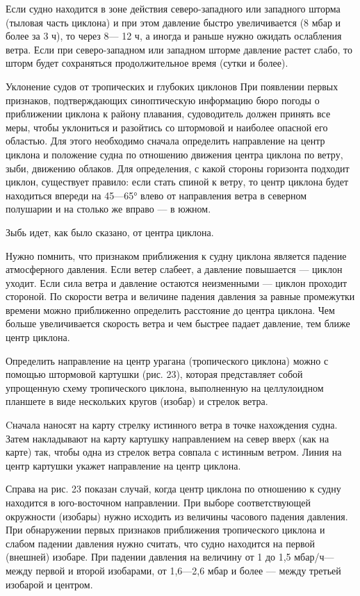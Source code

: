 Если судно находится в зоне действия северо-западного или западного шторма (тыловая часть циклона) и при этом давление быстро увеличивается (8 мбар и более за 3 ч), то через 8— 12 ч, а иногда и раньше нужно ожидать ослабления ветра. Если при северо-западном или западном шторме давление растет слабо, то шторм будет сохраняться продолжительное время (сутки и более).

Уклонение судов от тропических и глубоких циклонов
При появлении первых признаков, подтверждающих синоптическую информацию бюро погоды о приближении циклона к району плавания, судоводитель должен принять все меры, чтобы уклониться и разойтись со штормовой и наиболее опасной его областью. Для этого необходимо сначала определить направление на центр циклона и положение судна по отношению движения центра циклона по ветру, зыби, движению облаков. Для определения, с какой стороны горизонта подходит циклон, существует правило: если стать спиной к ветру, то центр циклона будет находиться впереди на 45—65° влево от направления ветра в северном полушарии и на столько же вправо — в южном.

Зыбь идет, как было сказано, от центра циклона.

Нужно помнить, что признаком приближения к судну циклона является падение атмосферного давления. Если ветер слабеет, а давление повышается — циклон уходит. Если сила ветра и давление остаются неизменными — циклон проходит стороной. По скорости ветра и величине падения давления за равные промежутки времени можно приближенно определить расстояние до центра циклона. Чем больше увеличивается скорость ветра и чем быстрее падает давление, тем ближе центр циклона.

Определить направление на центр урагана (тропического циклона) можно с помощью штормовой картушки (рис. 23), которая представляет собой упрощенную схему тропического циклона, выполненную на целлулоидном планшете в виде нескольких кругов (изобар) и стрелок ветра.

Cначала наносят на карту стрелку истинного ветра в точке нахождения судна. Затем накладывают на карту картушку направлением на север вверх (как на карте) так, чтобы одна из стрелок ветра совпала с истинным ветром. Линия на центр картушки укажет направление на центр циклона.

Справа на рис. 23 показан случай, когда центр циклона по отношению к судну находится в юго-восточном направлении. При выборе соответствующей окружности (изобары) нужно исходить из величины часового падения давления. При обнаружении первых признаков приближения тропического циклона и слабом падении давления нужно считать, что судно находится на первой (внешней) изобаре. При падении давления на величину от 1 до 1,5 мбар/ч—между первой и второй изобарами, от 1,6—2,6 мбар и более — между третьей изобарой и центром.


